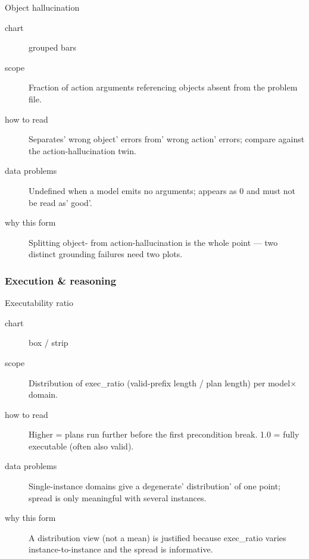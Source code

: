 \begin{bmplotcard}{Object hallucination}
\begin{description}
\item[chart] grouped bars
\item[scope] Fraction of action arguments referencing objects absent from the problem file.
\item[how to read] Separates' wrong object' errors from' wrong action' errors; compare against the action-hallucination twin.
\item[data problems] Undefined when a model emits no arguments; appears as 0 and must not be read as' good'.
\item[why this form] Splitting object- from action-hallucination is the whole point --- two distinct grounding failures need two plots.
\end{description}
\end{bmplotcard}

\subsubsection{Execution \& reasoning}

\begin{bmplotcard}{Executability ratio}
\begin{description}
\item[chart] box / strip
\item[scope] Distribution of exec\_ratio (valid-prefix length / plan length) per model\(\times\)domain.
\item[how to read] Higher = plans run further before the first precondition break. 1.0 = fully executable (often also valid).
\item[data problems] Single-instance domains give a degenerate' distribution' of one point; spread is only meaningful with several instances.
\item[why this form] A distribution view (not a mean) is justified because exec\_ratio varies instance-to-instance and the spread is informative.
\end{description}
\end{bmplotcard}

